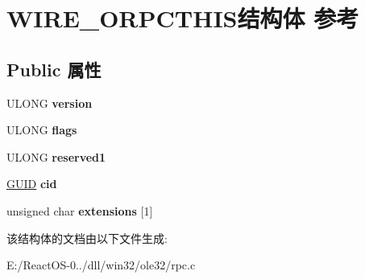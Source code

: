 \hypertarget{struct_w_i_r_e___o_r_p_c_t_h_i_s}{}\section{W\+I\+R\+E\+\_\+\+O\+R\+P\+C\+T\+H\+I\+S结构体 参考}
\label{struct_w_i_r_e___o_r_p_c_t_h_i_s}
\subsection*{Public 属性}
\begin{DoxyCompactItemize}
\item 
\mbox{\label{struct_w_i_r_e___o_r_p_c_t_h_i_s_a6ab155caa356bde50c417a2967d70fab}} 
U\+L\+O\+NG {\bfseries version}
\item 
\mbox{\label{struct_w_i_r_e___o_r_p_c_t_h_i_s_a1c7766a607e3928b13f57a4de44dad08}} 
U\+L\+O\+NG {\bfseries flags}
\item 
\mbox{\label{struct_w_i_r_e___o_r_p_c_t_h_i_s_aae32c784e0b79f0890ad536b123e1156}} 
U\+L\+O\+NG {\bfseries reserved1}
\item 
\mbox{\label{struct_w_i_r_e___o_r_p_c_t_h_i_s_a97ec282062c9eefc069beb0a16bee618}} 
\hyperlink{interface_g_u_i_d}{G\+U\+ID} {\bfseries cid}
\item 
\mbox{\label{struct_w_i_r_e___o_r_p_c_t_h_i_s_a518ac2b37e15fcd03a2da9700a31e700}} 
unsigned char {\bfseries extensions} \mbox{[}1\mbox{]}
\end{DoxyCompactItemize}


该结构体的文档由以下文件生成\+:\begin{DoxyCompactItemize}
\item 
E\+:/\+React\+O\+S-\/0../dll/win32/ole32/rpc.\+c\end{DoxyCompactItemize}

